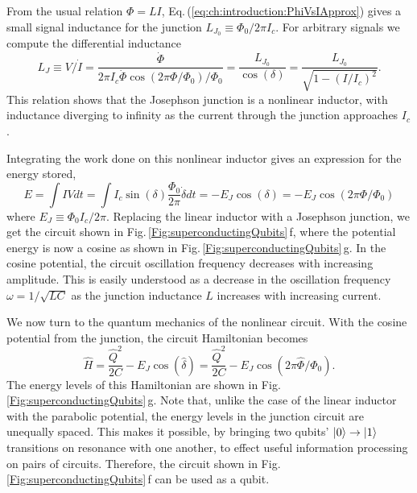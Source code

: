 From the usual relation $\Phi = LI$, Eq.\,(\ref{eq:ch:introduction:PhiVsIApprox}) gives a small signal inductance for the junction $L_{J_0} \equiv \Phi_0 / 2 \pi I_c$.
For arbitrary signals we compute the differential inductance \begin{equation}
L_J \equiv V / \dot{I} = \frac{\dot{\Phi}}{2 \pi I_c \dot{\Phi} \cos \left( 2 \pi \Phi / \Phi_0 \right) / \Phi_0} = \frac{L_{J_0}}{\cos(\delta)} = \frac{L_{J_0}}{\sqrt{1 - \left( I / I_c \right)^2}} . \end{equation}
This relation shows that the Josephson junction is a nonlinear inductor, with inductance diverging to infinity as the current through the junction approaches $I_c$.

Integrating the work done on this nonlinear inductor gives an expression for the energy stored, \begin{equation}
E = \int IV dt = \int I_c \sin(\delta) \frac{\Phi_0}{2\pi}\dot{\delta}dt = -E_J \cos(\delta) = -E_J \cos \left( 2 \pi \Phi / \Phi_0 \right) \label{eq:junctionEnergy} \end{equation}
where $E_J \equiv \Phi_0 I_c / 2\pi$.
Replacing the linear inductor with a Josephson junction, we get the circuit shown in Fig.\,\ref{Fig:superconductingQubits}\,f, where the potential energy is now a cosine as shown in Fig.\,\ref{Fig:superconductingQubits}\,g.
In the cosine potential, the circuit oscillation frequency decreases with increasing amplitude.
This is easily understood as a decrease in the oscillation frequency $\omega = 1/\sqrt{LC}$ as the junction inductance $L$ increases with increasing current.

We now turn to the quantum mechanics of the nonlinear circuit.
With the cosine potential from the junction, the circuit Hamiltonian becomes \begin{equation}
\hat{H} = \frac{\hat{Q}^2}{2C} - E_J \cos(\hat{\delta}) = \frac{\hat{Q}^2}{2C} - E_J \cos(2 \pi \hat{\Phi}/\Phi_0). \end{equation}
The energy levels of this Hamiltonian are shown in Fig.\,\ref{Fig:superconductingQubits}\,g.
Note that, unlike the case of the linear inductor with the parabolic potential, the energy levels in the junction circuit are unequally spaced.
This makes it possible, by bringing two qubits' $|0\rangle\rightarrow |1\rangle$ transitions on resonance with one another, to effect useful information processing on pairs of circuits.
Therefore, the circuit shown in Fig.\,\ref{Fig:superconductingQubits}\,f can be used as a qubit.

